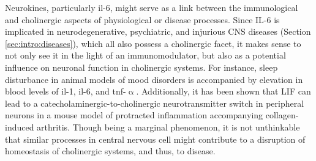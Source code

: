 Neurokines, particularly \ac{il}-6, might serve as a link between the immunological and cholinergic aspects of physiological or disease processes. Since IL-6 is implicated in neurodegenerative, psychiatric, and injurious CNS diseases (Section \ref{sec:intro:diseases}), which all also possess a cholinergic facet, it makes sense to not only see it in the light of an immunomodulator, but also as a potential influence on neuronal function in cholinergic systems. For instance, sleep disturbance in animal models of mood disorders is accompanied by elevation in blood levels of \ac{il}-1, \ac{il}-6, and \ac{tnf}-$\upalpha$.\cite{Hodes2015} Additionally, it has been shown that LIF can lead to a catecholaminergic-to-cholinergic neurotransmitter switch in peripheral neurons in a mouse model of protracted inflammation accompanying collagen-induced arthritis.\cite{Stangl2015} Though being a marginal phenomenon, it is not unthinkable that similar processes in central nervous cell might contribute to a disruption of homeostasis of cholinergic systems, and thus, to disease.


